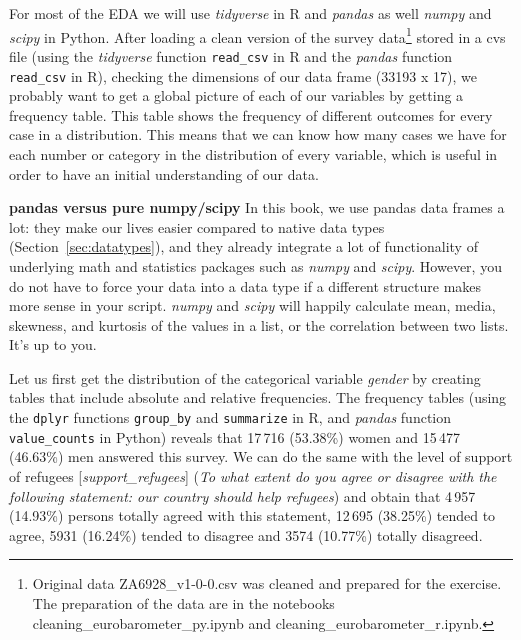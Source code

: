 For most of the EDA we will use \emph{tidyverse} in R and \emph{pandas} as well \emph{numpy} and \emph{scipy} in Python. After loading a clean version of the survey data\footnote{Original data ZA6928\_v1-0-0.csv was cleaned and prepared for the exercise. The preparation of the data are in the notebooks cleaning\_eurobarometer\_py.ipynb and cleaning\_eurobarometer\_r.ipynb.}  stored in a cvs file (using the \emph{tidyverse} function \texttt{read\_csv} in R and the \emph{pandas} function \texttt{read\_csv} in R), checking the dimensions of our data frame (33193 x 17), we probably want to get a global picture of each of our variables by getting a frequency table. This table shows the frequency of different outcomes for every case in a distribution. This means that we can know how many cases we have for each number or category in the distribution of every variable, which is useful in order to have an initial understanding of our data.

\begin{feature}
  \textbf{pandas versus pure numpy/scipy} In this book, we use pandas
  data frames a lot: they make our lives easier compared to native
  data types (Section~\ref{sec:datatypes}), and they already integrate a lot of
  functionality of underlying math and statistics packages such as
  \emph{numpy} and \emph{scipy}. However, you do not have to force your
  data into a data type if a different structure makes more sense in
  your script. \emph{numpy} and \emph{scipy} will happily calculate
  mean, media, skewness, and kurtosis of the values in a list, or the
  correlation between two lists. It's up to you.
\end{feature}


		
Let us first get the distribution of the categorical variable \textit{gender} by creating tables that include absolute and relative frequencies. The frequency tables (using the \texttt{dplyr} functions \texttt{group\_by} and \texttt{summarize} in R, and \emph{pandas} function \texttt{value\_counts} in Python) reveals that 17\,716 (53.38\%) women and 15\,477 (46.63\%) men answered this survey. We can do the same with the level of support of refugees [\textit{support\_refugees}] (\textit{To what extent do you agree or disagree with the following statement: our country should help refugees}) and obtain that 4\,957 (14.93\%) persons totally agreed with this statement, 12\,695 (38.25\%) tended to agree, 5931 (16.24\%) tended to disagree and 3574 (10.77\%) totally disagreed.

